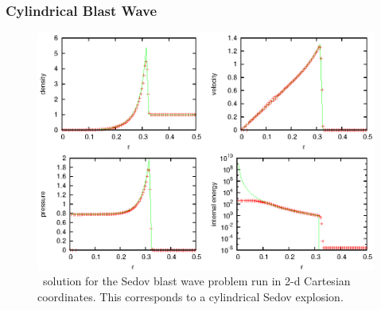 \subsubsection{Cylindrical Blast Wave}

\begin{figure}[h]
\centering
\includegraphics[width=5.0in]{CastroVerification/sedov_cyl}
\caption{\label{fig:sedov_cyl} \castro\ solution for the Sedov blast wave problem
  run in 2-d Cartesian coordinates.  This corresponds to a cylindrical
  Sedov explosion.}
\end{figure}

